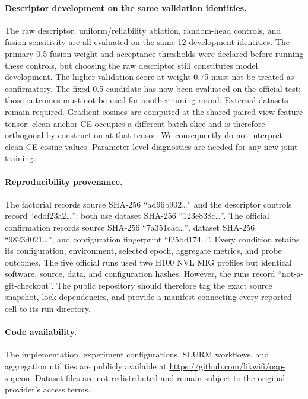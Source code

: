 \documentclass[runningheads]{llncs}
\begin{document}
\paragraph{Descriptor development on the same validation identities.}
The raw descriptor, uniform/reliability ablation, random-head controls, and
fusion sensitivity are all evaluated on the same 12 development identities.
The primary 0.5 fusion weight and acceptance thresholds were declared before
running these controls, but choosing the raw descriptor still constitutes model
development. The higher validation score at weight 0.75 must not be treated as
confirmatory. The fixed 0.5 candidate has now been evaluated on the official
test; those outcomes must not be used for another tuning round. External
datasets remain required.
Gradient cosines are computed at the shared paired-view feature tensor;
clean-anchor CE occupies a different batch slice and is therefore orthogonal by
construction at that tensor. We consequently do not interpret clean-CE cosine
values. Parameter-level diagnostics are needed for any new joint training.

\paragraph{Reproducibility provenance.}
The factorial records source SHA-256 ``ad96b902\ldots'' and the descriptor
controls record ``eddf23a2\ldots''; both use dataset SHA-256
``123e838c\ldots''. The official confirmation records source SHA-256
``7a351cac\ldots'', dataset SHA-256 ``9823d021\ldots'', and configuration
fingerprint ``f25bd174\ldots''. Every condition retains its configuration,
environment, selected epoch, aggregate metrics, and probe outcomes. The five
official runs used two H100 NVL MIG profiles but identical software, source,
data, and configuration hashes. However, the runs record
``not-a-git-checkout''.
The public repository should therefore tag the exact source snapshot, lock
dependencies, and provide a manifest connecting every reported cell to its run
directory.

\paragraph{Code availability.}
The implementation, experiment configurations, SLURM workflows, and aggregation
utilities are publicly available at
\url{https://github.com/likwifi/oap-supcon}. Dataset files are not redistributed
and remain subject to the original provider's access terms.
\end{document}
